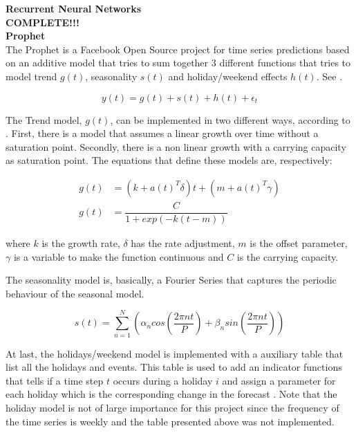 \documentclass[10pt,twocolumn,letterpaper]{article}
\begin{document}
\textbf{Recurrent Neural Networks}\\

\textbf{COMPLETE!!!}\\

\textbf{Prophet}\\

The Prophet is a Facebook Open Source project for time series predictions based on an additive model that tries to sum together 3 different functions that tries to model trend $g(t)$, seasonality $s(t)$ and holiday/weekend effects $h(t)$. See \cite{taylor2018forecasting}.

\begin{equation}
	y(t)=g(t)+s(t)+h(t)+\epsilon_t
\end{equation}

The Trend model, $g(t)$, can be implemented in two different ways, according to \cite{taylor2018forecasting}. First, there is a model that assumes a linear growth over time without a saturation point. Secondly, there is a non linear growth with a carrying capacity as saturation point. The equations that define these models are, respectively:

\begin{align}
	g(t)&=(k+a(t)^T\delta)t+(m+a(t)^T\gamma)\\
	g(t)&=\dfrac{C}{1+exp(-k(t-m))}
\end{align}

where $k$ is the growth rate, $\delta$ has the rate adjustment, $m$ is the offset parameter, $\gamma$ is a variable to make the function continuous and $C$ is the carrying capacity.

The seasonality model is, basically, a Fourier Series that captures the periodic behaviour of the seasonal model.

\begin{equation}
	s(t)=\sum_{n=1}^{N}\left(\alpha_ncos\left(\dfrac{2\pi nt}{P}\right)+\beta_nsin\left(\dfrac{2\pi nt}{P}\right)\right)
\end{equation} 


At last, the holidays/weekend model is implemented with a auxiliary table that list all the holidays and events. This table is used to add an indicator functions that tells if a time step $t$ occurs during a holiday $i$ and assign a parameter for each holiday which is the corresponding change in the forecast \cite{taylor2018forecasting}. Note that the holiday model is not of large importance for this project since the frequency of the time series is weekly and the table presented above was not implemented.\\ 
\end{document}
